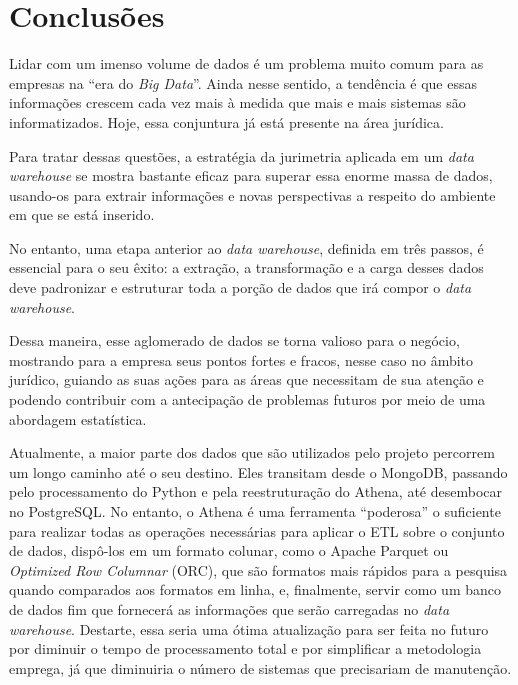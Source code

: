 \section{Conclusões}
\label{sec:conclusao}

Lidar com um imenso volume de dados é um problema muito comum para as empresas na \enquote{era do \textit{Big Data}}. Ainda nesse sentido, a tendência é que essas informações crescem cada vez mais à medida que mais e mais sistemas são informatizados. Hoje, essa conjuntura já está presente na área jurídica.

Para tratar dessas questões, a estratégia da jurimetria aplicada em um \textit{data warehouse} se mostra bastante eficaz para superar essa enorme massa de dados, usando-os para extrair informações e novas perspectivas a respeito do ambiente em que se está inserido.

No entanto, uma etapa anterior ao \textit{data warehouse}, definida em três passos, é essencial para o seu êxito: a extração, a transformação e a carga desses dados deve padronizar e estruturar toda a porção de dados que irá compor o \textit{data warehouse}.

Dessa maneira, esse aglomerado de dados se torna valioso para o negócio, mostrando para a empresa seus pontos fortes e fracos, nesse caso no âmbito jurídico, guiando as suas ações para as áreas que necessitam de sua atenção e podendo contribuir com a antecipação de problemas futuros por meio de uma abordagem estatística.

Atualmente, a maior parte dos dados que são utilizados pelo projeto percorrem um longo caminho até o seu destino. Eles transitam desde o MongoDB, passando pelo processamento do Python e pela reestruturação do Athena, até desembocar no PostgreSQL. No entanto, o Athena é uma ferramenta \enquote{poderosa} o suficiente para realizar todas as operações necessárias para aplicar o ETL sobre o conjunto de dados, dispô-los em um formato colunar, como o Apache Parquet ou \textit{Optimized Row Columnar} (ORC), que são formatos mais rápidos para a pesquisa quando comparados aos formatos em linha, e, finalmente, servir como um banco de dados fim que fornecerá as informações que serão carregadas no \textit{data warehouse}. Destarte, essa seria uma ótima atualização para ser feita no futuro por diminuir o tempo de processamento total e por simplificar a metodologia emprega, já que diminuiria o número de sistemas que precisariam de manutenção.